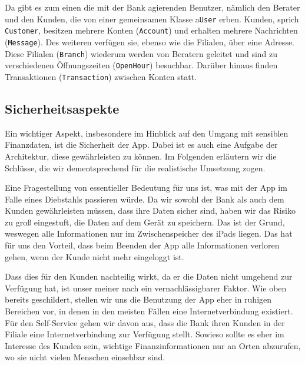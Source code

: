 	
	
	Da gibt es zum einen die mit der Bank agierenden Benutzer, nämlich den Berater und den Kunden, die von einer gemeinsamen Klasse a\texttt{User} erben. Kunden, sprich \texttt{Customer}, besitzen mehrere Konten (\texttt{Account}) und erhalten mehrere Nachrichten (\texttt{Message}). Des weiteren verfügen sie, ebenso wie die Filialen,  über eine Adresse. Diese Filialen (\texttt{Branch}) wiederum werden von Beratern geleitet und sind zu verschiedenen Öffnungszeiten (\texttt{OpenHour}) besuchbar. Darüber hinaus finden Transaktionen (\texttt{Transaction}) zwischen Konten statt.

\subsection{Sicherheitsaspekte}
%
	Ein wichtiger Aspekt, insbesondere im Hinblick auf den Umgang mit sensiblen Finanzdaten, ist die Sicherheit der App. Dabei ist es auch eine Aufgabe der Architektur, diese gewährleisten zu können. Im Folgenden erläutern wir die Schlüsse, die wir dementsprechend für die realistische Umsetzung zogen.
	
	Eine Fragestellung von essentieller Bedeutung für uns ist, was mit der App im Falle eines Diebstahls passieren würde. Da wir sowohl der Bank als auch dem Kunden gewährleisten müssen, dass ihre Daten sicher sind, haben wir das Risiko zu groß eingestuft, die Daten auf dem Gerät zu speichern. Das ist der Grund, weswegen alle Informationen nur im Zwischenspeicher des iPads liegen. Das hat für uns den Vorteil, dass beim Beenden der App alle Informationen verloren gehen, wenn der Kunde nicht mehr eingeloggt ist.
	
	Dass dies für den Kunden nachteilig wirkt, da er die Daten nicht umgehend zur Verfügung hat, ist unser meiner nach ein vernachlässigbarer Faktor. Wie oben bereits geschildert, stellen wir uns die Benutzung der App eher in ruhigen Bereichen vor, in denen in den meisten Fällen eine Internetverbindung existiert. Für den Self-Service gehen wir davon aus, dass die Bank ihren Kunden in der Filiale eine Internetverbindung zur Verfügung stellt. Sowieso sollte es eher im Interesse des Kunden sein, wichtige Finanzinformationen nur an Orten abzurufen, wo sie nicht vielen Menschen einsehbar sind.
	
